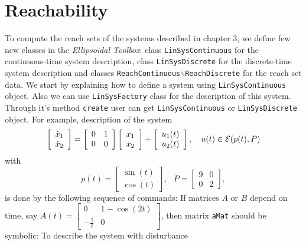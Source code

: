 \section{Reachability}
To compute the reach sets of the systems described in chapter 3, we define
few new classes in the {\it Ellipsoidal Toolbox}: class {\tt LinSysContinuous}
for the continuous-time system description, class {\tt LinSysDiscrete}
for the discrete-time system description and classes {\tt ReachContinuous$\backslash$ReachDiscrete} for the reach set data. We start by explaining how to define a system
using {\tt LinSysContinuous} object. Also we can use {\tt LinSysFactory} class for the description of this system.
Through it's method {\tt create} user can get {\tt LinSysContinuous} or {\tt LinSysDiscrete} object.
For example, description of the system
\[ \left[\begin{array}{cc}
\dot{x}_1\\
\dot{x}_2\end{array}\right] = \left[\begin{array}{cc}
0 & 1\\
0 & 0\end{array}\right]\left[\begin{array}{c}
x_1\\
x_2\end{array}\right] + \left[\begin{array}{c}
u_1(t)\\
u_2(t)\end{array}\right], ~~~ u(t)\in\EE(p(t), P) \]
with
\[ p(t) = \left[\begin{array}{c}
\sin(t)\\
\cos(t)\end{array}\right], ~~~ P = \left[\begin{array}{cc}
9 & 0\\
0 & 2\end{array}\right], \]
is done by the following sequence of commands:
If matrices $A$ or $B$ depend on time, say $A(t)=\left[\begin{array}{cc}
0 & 1-\cos(2t)\\
-\frac{1}{t} & 0\end{array}\right]$, then matrix {\tt aMat} should be symbolic:
To describe the system with disturbance
